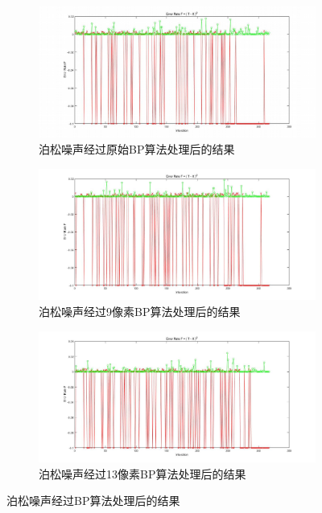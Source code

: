 \documentclass{article}
\newcounter{sub}
\begin{document}
\begin{figure}[htpb]
	\centering
	\begin{subfigure}[htpb]{.45\linewidth}
		\centering
		\includegraphics[width=\linewidth]{Possion-5.png}
		\caption{泊松噪声经过原始BP算法处理后的结果}
		\label{fig:泊松噪声经过原始BP算法处理后的结果}
	\end{subfigure}
	\quad
	\begin{subfigure}[htpb]{.45\linewidth}
		\centering
		\includegraphics[width=\linewidth]{Possion-9.png}
		\caption{泊松噪声经过9像素BP算法处理后的结果}
		\label{fig:泊松噪声经过9像素BP算法处理后的结果}
	\end{subfigure}
	\quad
	\begin{subfigure}[htpb]{.45\linewidth}
		\centering
		\includegraphics[width=\linewidth]{Possion-13.png}
		\caption{泊松噪声经过13像素BP算法处理后的结果}
		\label{fig:泊松噪声经过13像素BP算法处理后的结果}
	\end{subfigure}
	\caption{泊松噪声经过BP算法处理后的结果}
	\label{fig:泊松噪声经过BP算法处理后的结果}
\end{figure}
\end{document}
